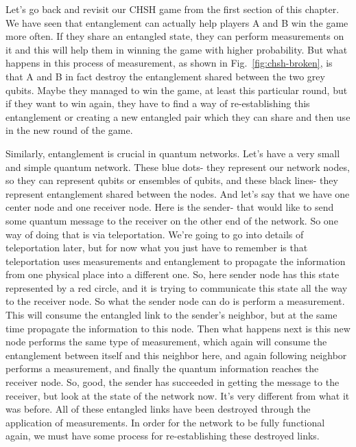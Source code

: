 
Let's go back and revisit our CHSH game from the first section of this chapter. We have seen that entanglement can actually help players A and B win the game more often. If they share an entangled state, they can perform measurements on it and this will help them in winning the game with higher probability. But what happens in this process of measurement, as shown in Fig.~\ref{fig:chsh-broken}, is that A and B in fact destroy the entanglement shared between the two grey qubits.  Maybe they managed to win the game, at least this particular round, but if they want to win again, they have to find a way of re-establishing this entanglement or creating a new entangled pair which they can share and then use in the new round of the game. 

Similarly, entanglement is crucial in quantum networks. Let's have a very small and simple quantum network. These blue dots- they represent our network nodes, so they can represent qubits or ensembles of qubits, and these black lines- they represent entanglement shared between the nodes. And let's say that we have one center node and one receiver node. Here is the sender- that would like to send some quantum message to the receiver on the other end of the network. So one way of doing that is via teleportation. We're going to go into details of teleportation later, but for now what you just have to remember is that teleportation uses measurements and entanglement to propagate the information from one physical place into a different one. So, here sender node has this state represented by a red circle, and it is trying to communicate this state all the way to the receiver node. So what the sender node can do is perform a measurement. This will consume the entangled link to the sender's neighbor, but at the same time propagate the information to this node. Then what happens next is this new node performs the same type of measurement, which again will consume the entanglement between itself and this neighbor here, and again following neighbor performs a measurement, and finally the quantum information reaches the receiver node. So, good, the sender has succeeded in getting the message to the receiver, but look at the state of the network now. It's very different from what it was before. All of these entangled links have been destroyed through the application of measurements. In order for the network to be fully functional again, we must have some process for re-establishing these destroyed links.

